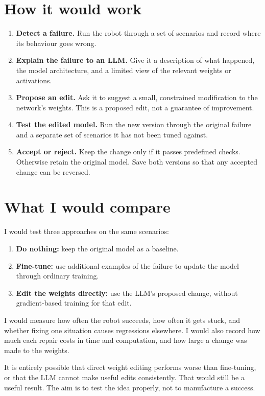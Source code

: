 \documentclass[11pt,a4paper]{article}
\begin{document}
\section*{How it would work}
\begin{enumerate}[leftmargin=*]
\item \textbf{Detect a failure.} Run the robot through a set of scenarios and record where its behaviour goes wrong.
\item \textbf{Explain the failure to an LLM.} Give it a description of what happened, the model architecture, and a limited view of the relevant weights or activations.
\item \textbf{Propose an edit.} Ask it to suggest a small, constrained modification to the network's weights. This is a proposed edit, not a guarantee of improvement.
\item \textbf{Test the edited model.} Run the new version through the original failure and a separate set of scenarios it has not been tuned against.
\item \textbf{Accept or reject.} Keep the change only if it passes predefined checks. Otherwise retain the original model. Save both versions so that any accepted change can be reversed.
\end{enumerate}

\section*{What I would compare}
I would test three approaches on the same scenarios:
\begin{enumerate}[leftmargin=*]
\item \textbf{Do nothing:} keep the original model as a baseline.
\item \textbf{Fine-tune:} use additional examples of the failure to update the model through ordinary training.
\item \textbf{Edit the weights directly:} use the LLM's proposed change, without gradient-based training for that edit.
\end{enumerate}

I would measure how often the robot succeeds, how often it gets stuck, and whether fixing one situation causes regressions elsewhere. I would also record how much each repair costs in time and computation, and how large a change was made to the weights.

It is entirely possible that direct weight editing performs worse than fine-tuning, or that the LLM cannot make useful edits consistently. That would still be a useful result. The aim is to test the idea properly, not to manufacture a success.
\end{document}
